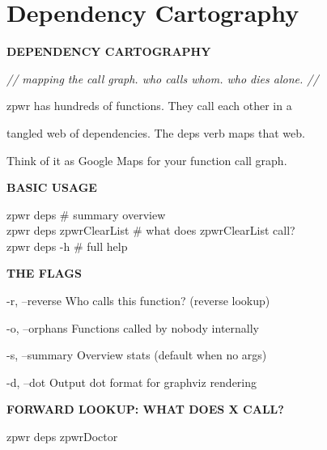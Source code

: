 \documentclass[11pt,a4paper,twoside]{book}
\begin{document}
\vspace{16pt}

\section{Dependency Cartography}


\vspace{10pt}
{\large\bfseries\color{neoncyan} DEPENDENCY CARTOGRAPHY}\vspace{6pt}

{\small\itshape\color{dimtext} // mapping the call graph. who calls whom. who dies alone. //}

\begin{codebox}
zpwr has hundreds of functions. They call each other in a\\
\end{codebox}

tangled web of dependencies. The deps verb maps that web.

Think of it as Google Maps for your function call graph.


\vspace{12pt}
{\bfseries\color{neonyellow} BASIC USAGE}\vspace{4pt}

\begin{codebox}
zpwr deps                          \# summary overview\\
zpwr deps zpwrClearList             \# what does zpwrClearList call?\\
zpwr deps -h                        \# full help\\
\end{codebox}


\vspace{12pt}
{\bfseries\color{neonyellow} THE FLAGS}\vspace{4pt}

-r, --reverse    Who calls this function? (reverse lookup)

-o, --orphans    Functions called by nobody internally

-s, --summary    Overview stats (default when no args)

-d, --dot        Output dot format for graphviz rendering


\vspace{12pt}
{\bfseries\color{neonyellow} FORWARD LOOKUP: WHAT DOES X CALL?}\vspace{4pt}

\begin{codebox}
zpwr deps zpwrDoctor\\
\end{codebox}
\end{document}
